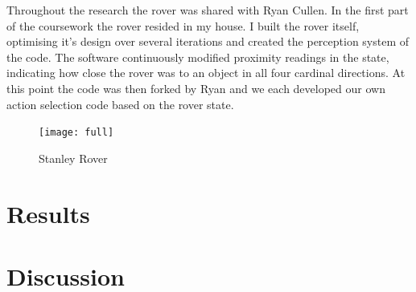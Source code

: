 \documentclass[a4paper,12pt,twocolumn]{report}
\begin{document}
Throughout the research the rover was shared with Ryan Cullen. In the first part of the coursework the rover resided in my house. I built the rover itself, optimising it's design over several iterations and created the perception system of the code. The software continuously modified proximity readings in the state, indicating how close the rover was to an object in all four cardinal directions. At this point the code was then forked by Ryan and we each developed our own action selection code based on the rover state.

\begin{figure}[b]
 \texttt{[image: full]}
 \caption{Stanley Rover}
 \label{fig:stanley}
\end{figure}

\section{Results}




\section{Discussion}
\end{document}
